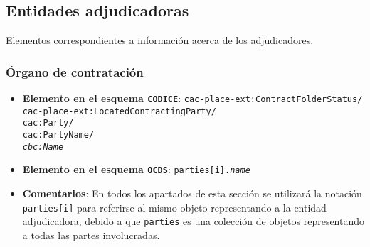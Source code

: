     \vspace{0.3cm}
    
    \subsection{Entidades adjudicadoras}
    
        Elementos correspondientes a información acerca de los adjudicadores.
    
        \subsubsection{Órgano de contratación}
            \begin{itemize}
                \item \textbf{Elemento en el esquema \texttt{CODICE}}:
                    \tabto{7.6cm} \texttt{cac-place-ext:ContractFolderStatus/} \\
                    \tabto{7.6cm} \texttt{cac-place-ext:LocatedContractingParty/} \\
                    \tabto{7.6cm} \texttt{cac:Party/} \\
                    \tabto{7.6cm} \texttt{cac:PartyName/} \\
                    \tabto{7.6cm} \texttt{\textit{cbc:Name}}
                \item \textbf{Elemento en el esquema \texttt{OCDS}}:
                    \tabto{7.6cm} \texttt{parties[i].\textit{name}}
                \item \textbf{Comentarios}: En todos los apartados de esta sección se utilizará la notación \texttt{parties[i]} para referirse al mismo objeto representando a la entidad adjudicadora, debido a que \texttt{parties} es una colección de objetos representando a todas las partes involucradas.
            \end{itemize}
        
